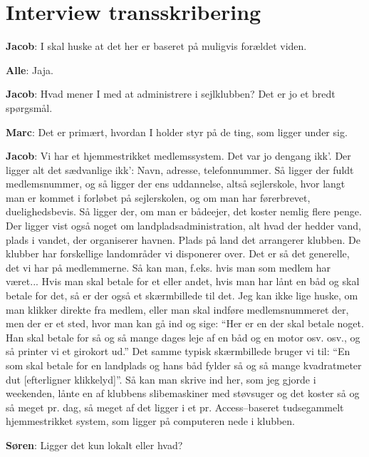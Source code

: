 \chapter{Interview transskribering}\label{bilag:interview-transkribering}
\textbf{Jacob}: I skal huske at det her er baseret på muligvis forældet viden.

\textbf{Alle}: Jaja.

\textbf{Jacob}: Hvad mener I med at administrere i sejlklubben? Det er jo et bredt spørgsmål.


\textbf{Marc}: Det er primært, hvordan I holder styr på de ting, som ligger under sig.

\textbf{Jacob}: Vi har et hjemmestrikket medlemssystem.
Det var jo dengang ikk'.
Der ligger alt det sædvanlige ikk': Navn, adresse, telefonnummer.
Så ligger der fuldt medlemsnummer, og så ligger der ens uddannelse, altså sejlerskole, hvor langt man er kommet i forløbet på sejlerskolen, og om man har førerbrevet, duelighedsbevis.
Så ligger der, om man er bådeejer, det koster nemlig flere penge.
Der ligger vist også noget om landpladsadministration, alt hvad der hedder vand, plads i vandet, der organiserer havnen.
Plads på land det arrangerer klubben.
De klubber har forskellige landområder vi disponerer over.
Det er så det generelle, det vi har på medlemmerne.
Så kan man, f.eks.
hvis man som medlem har været...
Hvis man skal betale for et eller andet, hvis man har lånt en båd og skal betale for det, så er der også et skærmbillede til det.
Jeg kan ikke lige huske, om man klikker direkte fra medlem, eller man skal indføre medlemsnummeret der, men der er et sted, hvor man kan gå ind og sige: ``Her er en der skal betale noget.
Han skal betale for så og så mange dages leje af en båd og en motor osv. osv., og så printer vi et girokort ud.'' Det samme typisk skærmbillede bruger vi til: ``En som skal betale for en landplads og hans båd fylder så og så mange kvadratmeter dut [efterligner klikkelyd]''. 
Så kan man skrive ind her, som jeg gjorde i weekenden, lånte en af klubbens slibemaskiner med støvsuger og det koster så og så meget pr. dag, så meget af det ligger i et pr. Access--baseret tudsegammelt hjemmestrikket system, som ligger på computeren nede i klubben.

\textbf{Søren}: Ligger det kun lokalt eller hvad?

